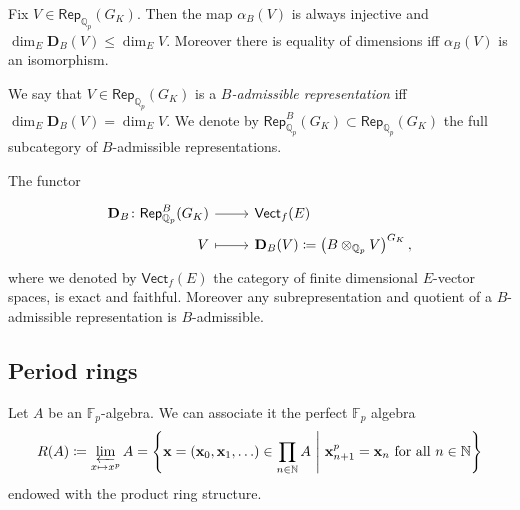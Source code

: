 \begin{prop}
	Fix $V \in \mathsf{Rep}_{\mathbb{Q}_p}(G_K)$.
	Then the map $\alpha_B(V)$ is always injective and
	$\dim_E \mathbf{D}_B(V) \leq \dim_E V$.
	Moreover there is equality of dimensions iff $\alpha_B(V)$ is an isomorphism.
\end{prop}


\begin{defn}
	We say that $V \in \mathsf{Rep}_{\mathbb{Q}_p}(G_K)$ is a
	{\em $B$-admissible representation} iff 
	$\dim_E \mathbf{D}_B(V) = \dim_E V$.
	We denote by $\mathsf{Rep}_{\mathbb{Q}_p}^B(G_K) \subset \mathsf{Rep}_{\mathbb{Q}_p}(G_K)$
	the full subcategory of $B$-admissible representations.
\end{defn}


\begin{prop}
	The functor
	\begin{equation*}
	\begin{tikzcd}[row sep = 0ex
		,/tikz/column 1/.append style={anchor=base east}
		,/tikz/column 2/.append style={anchor=base west}]
		\mathbf{D}_B\colon \mathsf{Rep}_{\mathbb{Q}_p}^B(G_K) \arrow[r, "", rightarrow] &
		\mathsf{Vect}_f(E) \\
		V \arrow[r, "", mapsto] & 
		\mathbf{D}_B(V) \coloneqq \left( B \otimes_{\mathbb{Q}_p} V \right)^{G_K}
	,\end{tikzcd}
	\end{equation*} 
	where we denoted by $\mathsf{Vect}_f(E)$ the category of finite dimensional $E$-vector spaces,
	is exact and faithful.
	Moreover any subrepresentation and quotient of a $B$-admissible
	representation is $B$-admissible.
\end{prop}



\subsection{Period rings}
\begin{defn}[]
	Let $A$ be an $\mathbb{F}_p$-algebra.
	We can associate it the perfect $\mathbb{F}_p$ algebra
	\begin{equation*}
		R(A) \coloneqq \varprojlim_{x \mapsto x^p} A =
		\left\{ \mathbf{x} = \left( \mathbf{x}_0, \mathbf{x}_1, \ldots \right) 
			\in \prod_{n \in \mathbb{N}} A
		\ \middle|\ \mathbf{x}_{n+1}^p = \mathbf{x}_n \text{ for all } n \in \mathbb{N} \right\}
	\end{equation*}
	endowed with the product ring structure.
\end{defn}


